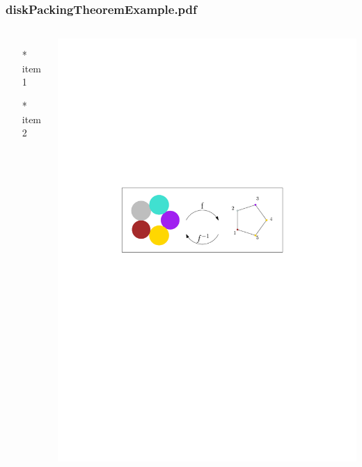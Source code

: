 \begin{frame} \frametitle{diskPackingTheoremExample.pdf}
    \begin{columns}[c]
        \begin{itemize}
            \item[*] item 1
            \item[*] item 2
        \end{itemize}
        \begin{minipage}{\linewidth}
            \begin{center}
            \includegraphics[width=.9\textwidth]{graphics/diskPackingTheoremExample.pdf}
            \label{gfx:diskPackingTheoremExample.pdf}
            \end{center}
        \end{minipage}
    \end{columns}
\end{frame}
